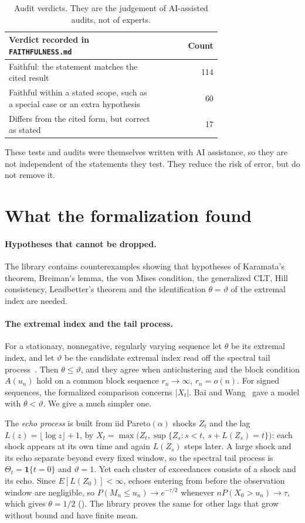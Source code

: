 \documentclass[11pt]{article}
\newcommand{\lean}[1]{\texttt{\detokenize{#1}}}
\begin{document}
\begin{table}[ht]
\centering\small
\begin{tabular}{p{0.72\linewidth}r}
\toprule
Verdict recorded in \texttt{FAITHFULNESS.md} & Count \\
\midrule
Faithful: the statement matches the cited result & 114 \\
Faithful within a stated scope, such as a special case or an extra hypothesis & 60 \\
Differs from the cited form, but correct as stated & 17 \\
\bottomrule
\end{tabular}
\caption{Audit verdicts. They are the judgement of AI-assisted audits, not of experts.}
\label{tab:audit}
\end{table}

These tests and audits were themselves written with AI assistance, so they are not independent of the
statements they test. They reduce the risk of error, but do not remove it.

\section{What the formalization found}\label{sec:new}

\paragraph{Hypotheses that cannot be dropped.}
The library contains counterexamples showing that hypotheses of Karamata's theorem, Breiman's lemma, the
von Mises condition, the generalized CLT, Hill consistency, Leadbetter's theorem and the
identification $\theta=\vartheta$ of the extremal index are needed.

\paragraph{The extremal index and the tail process.}
For a stationary, nonnegative, regularly varying sequence let $\theta$ be its extremal index, and let $\vartheta$ be
the candidate extremal index read off the spectral tail process~\cite{ks20}. Then $\theta\le\vartheta$, and they agree
when anticlustering and the block condition $A(u_n)$ hold on a common block sequence $r_n\to\infty$, $r_n=o(n)$. For
signed sequences, the formalized comparison concerns $|X_t|$. Bai and Wang~\cite{bw} gave a model with $\theta<\vartheta$. We give a much simpler one.

The \emph{echo process} is built from iid Pareto$(\alpha)$ shocks $Z_t$ and the lag $L(z)=\lfloor\log z\rfloor+1$, by
$X_t=\max\bigl(Z_t,\sup\{Z_s: s<t,\ s+L(Z_s)=t\}\bigr)$: each shock appears at its own time and again $L(Z_s)$ steps later.
A large shock and its echo separate beyond every fixed window, so the spectral tail process is
$\Theta_t=\mathbf 1\{t=0\}$ and $\vartheta=1$. Yet each cluster of exceedances consists of a shock and its echo. Since
$E[L(Z_0)]<\infty$, echoes entering from before the observation window are negligible, so
$P(M_n\le u_n)\to e^{-\tau/2}$ whenever $nP(X_0>u_n)\to\tau$, which gives $\theta=1/2$
(\lean{logEchoProcess_theta_lt_vartheta}). The library proves the same for other lags that grow without bound and have finite mean.
\end{document}
